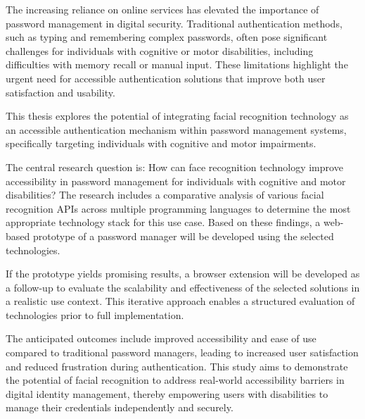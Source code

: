 The increasing reliance on online services has elevated the importance of password management in digital security. Traditional authentication methods, such as typing and remembering complex passwords, often pose significant challenges for individuals with cognitive or motor disabilities, including difficulties with memory recall or manual input. These limitations highlight the urgent need for accessible authentication solutions that improve both user satisfaction and usability.

This thesis explores the potential of integrating facial recognition technology as an accessible authentication mechanism within password management systems, specifically targeting individuals with cognitive and motor impairments.

The central research question is: How can face recognition technology improve accessibility in password management for individuals with cognitive and motor disabilities? The research includes a comparative analysis of various facial recognition APIs across multiple programming languages to determine the most appropriate technology stack for this use case. Based on these findings, a web-based prototype of a password manager will be developed using the selected technologies.

If the prototype yields promising results, a browser extension will be developed as a follow-up to evaluate the scalability and effectiveness of the selected solutions in a realistic use context. This iterative approach enables a structured evaluation of technologies prior to full implementation.

The anticipated outcomes include improved accessibility and ease of use compared to traditional password managers, leading to increased user satisfaction and reduced frustration during authentication. This study aims to demonstrate the potential of facial recognition to address real-world accessibility barriers in digital identity management, thereby empowering users with disabilities to manage their credentials independently and securely.

